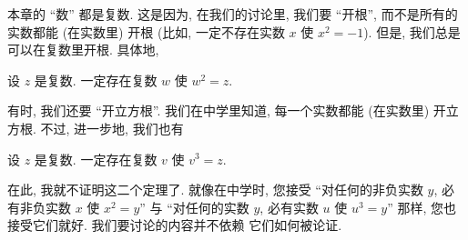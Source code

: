 
本章的 ``数'' 都是复数.
这是因为, 在我们的讨论里, 我们要 ``开根'',
而不是所有的实数都能 (在实数里) 开根
(比如, 一定不存在实数 \(x\) 使 \(x^2 = -1\)).
但是, 我们总是可以在复数里开根.
具体地,

\begin{theorem}
    设 \(z\) 是复数.
    一定存在复数 \(w\) 使 \(w^2 = z\).
\end{theorem}

有时,
我们还要 ``开立方根''.
我们在中学里知道, 每一个实数都能 (在实数里) 开立方根.
不过, 进一步地, 我们也有

\begin{theorem}
    设 \(z\) 是复数.
    一定存在复数 \(v\) 使 \(v^3 = z\).
\end{theorem}

在此, 我就不证明这二个定理了.
就像在中学时, 您接受
``对任何的非负实数 \(y\),
必有非负实数 \(x\) 使 \(x^2 = y\)''
与
``对任何的实数 \(y\),
必有实数 \(u\) 使 \(u^3 = y\)''
那样,
您也接受它们就好.
我们要讨论的内容并不依赖%
它们如何被论证.


